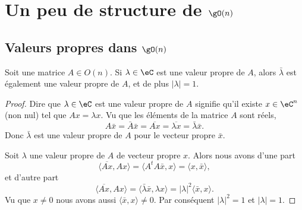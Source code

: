 \section{Un peu de structure de \texorpdfstring{\( \gO(n)\)}{O(n)}}

\subsection{Valeurs propres dans \( \gO(n)\)}

\begin{proposition}      \label{PROPooVEJGooWnqtMm}
    Soit une matrice \( A\in O(n)\). Si \( \lambda\in \eC\) est une valeur propre de \( A\), alors \( \bar\lambda\) est également une valeur propre de \( A\), et de plus \( | \lambda |=1\).
\end{proposition}

\begin{proof}
    Dire que \( \lambda\in \eC\) est une valeur propre de \( A\) signifie qu'il existe \( x\in \eC^n\) (non nul) tel que \( Ax=\lambda x\). Vu que les éléments de la matrice \( A\) sont réels,
    \begin{equation}
        A\bar x=\bar A\bar x=\overline{ Ax }=\overline{ \lambda x }=\bar \lambda\bar x.
    \end{equation}
    Donc \( \bar \lambda\) est une valeur propre de \( A\) pour le vecteur propre \( \bar x\).

    Soit \( \lambda\)  une valeur propre de \( A\) de vecteur propre \( x\). Alors nous avons d'une part
    \begin{equation}
        \langle \overline{ Ax }, Ax\rangle =\langle A^tA\bar x, x\rangle =\langle x, \bar x\rangle ,
    \end{equation}
    et d'autre part
    \begin{equation}
        \langle \overline{ Ax }, Ax\rangle =\langle \bar \lambda \bar x, \lambda x\rangle =| \lambda |^2\langle \bar x, x\rangle .
    \end{equation}
    Vu que \( x\neq 0\) nous avons aussi \( \langle \bar x, x\rangle \neq 0\). Par conséquent \( | \lambda |^2=1\) et \( | \lambda |=1\).
\end{proof}

